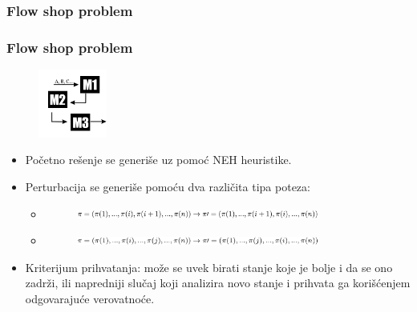 \documentclass{beamer}
\begin{document}
\subsubsection{Flow shop problem}
\begin{frame}[fragile]\frametitle{Flow shop problem}
\begin{figure}[h!]
  \centering
  \includegraphics[width=0.2\textwidth]{flowshop.png}
  \label{figure:fsp}
\end{figure}
\begin{itemize}
  \item Početno rešenje se generiše uz pomoć NEH heuristike.
  \item Perturbacija se generiše pomoću dva različita tipa poteza: \\
	\begin{itemize}
 		 \item \begin{figure}[h!]
 			 \centering
  			 \includegraphics[width=0.8\textwidth]{f1.png}
		            \label{figure:f1}
			  \end{figure}
		\item \begin{figure}[h!]
 			 \centering
  			 \includegraphics[width=0.8\textwidth]{f2.png}
		            \label{figure:f2}
			  \end{figure}
	\end{itemize}
  \item Kriterijum prihvatanja: može se uvek birati stanje koje je bolje i da se ono zadrži, ili napredniji slučaj koji analizira novo stanje i prihvata ga korišćenjem odgovarajuće verovatnoće.
\end{itemize}
\end{frame}
\end{document}
